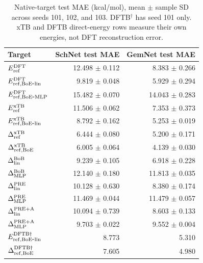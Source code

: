 \begin{table}[H]
\centering
\scriptsize
\setlength{\tabcolsep}{4pt}
\renewcommand{\arraystretch}{1.35}
\caption{Native-target test MAE (kcal/mol), mean $\pm$ sample SD across seeds 101, 102, and 103. DFTB$^\dagger$ has seed 101 only. xTB and DFTB direct-energy rows measure their own energies, not DFT reconstruction error.}
\begin{tabular}{lrr}
\toprule
Target & SchNet test MAE & GemNet test MAE \\
\midrule
\(E_{\rm ref}^{\rm DFT}\) & 12.498 $\pm$ 0.112 & 8.383 $\pm$ 0.266 \\
\(E_{\rm ref,BoE\mbox{-}lin}^{\rm DFT}\) & 9.819 $\pm$ 0.048 & 5.929 $\pm$ 0.294 \\
\(E_{\rm ref,BoE\mbox{-}MLP}^{\rm DFT}\) & 15.482 $\pm$ 0.070 & 14.043 $\pm$ 0.283 \\
\(E_{\rm ref}^{\rm xTB}\) & 11.506 $\pm$ 0.062 & 7.353 $\pm$ 0.373 \\
\(E_{\rm ref,BoE\mbox{-}lin}^{\rm xTB}\) & 8.792 $\pm$ 0.162 & 5.253 $\pm$ 0.019 \\
\(\Delta^{\rm xTB}_{\rm ref}\) & 6.444 $\pm$ 0.080 & 5.200 $\pm$ 0.171 \\
\(\Delta^{\rm xTB}_{\rm ref,BoE}\) & 6.005 $\pm$ 0.064 & 4.139 $\pm$ 0.030 \\
\(\Delta^{\rm BoB}_{\rm lin}\) & 9.239 $\pm$ 0.105 & 6.918 $\pm$ 0.228 \\
\(\Delta^{\rm BoB}_{\rm MLP}\) & 12.140 $\pm$ 0.180 & 11.813 $\pm$ 0.035 \\
\(\Delta^{\rm PRE}_{\rm lin}\) & 10.128 $\pm$ 0.630 & 8.380 $\pm$ 0.174 \\
\(\Delta^{\rm PRE}_{\rm MLP}\) & 11.469 $\pm$ 0.044 & 11.479 $\pm$ 0.057 \\
\(\Delta^{\rm PRE+A}_{\rm lin}\) & 10.094 $\pm$ 0.739 & 8.603 $\pm$ 0.133 \\
\(\Delta^{\rm PRE+A}_{\rm MLP}\) & 9.703 $\pm$ 0.022 & 9.552 $\pm$ 0.004 \\
\(E_{\rm ref,BoE\mbox{-}lin}^{\rm DFTB\dagger}\) & 8.773 & 5.310 \\
\(\Delta^{\rm DFTB\dagger}_{\rm ref,BoE}\) & 7.605 & 4.980 \\
\bottomrule
\end{tabular}
\end{table}
